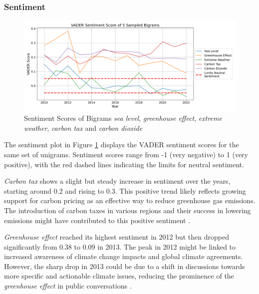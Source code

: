 \subsubsection{Sentiment}
\begin{figure}[h]
    \includegraphics[width=\textwidth]{images/topic_details/ngram/sentiment_per_topic_5Bigram.png}
    \caption{Sentiment Scores of Bigrams \emph{sea level}, \emph{greenhouse effect}, \emph{extreme weather}, \emph{carbon tax} and \emph{carbon dioxide}}
    \label{fig:sentiment_bigrams}
\end{figure}
The sentiment plot in Figure \ref{fig:sentiment_bigrams} displays the VADER sentiment scores for the same set of unigrams. Sentiment scores range from -1 (very negative) to 1 (very positive), with the red dashed lines indicating the limits for neutral sentiment.

\emph{Carbon tax} shows a slight but steady increase in sentiment over the years, starting around 0.2 and rising to 0.3. This positive trend likely reflects growing support for carbon pricing as an effective way to reduce greenhouse gas emissions. The introduction of carbon taxes in various regions and their success in lowering emissions might have contributed to this positive sentiment \cite{murray2015bc}.

\emph{Greenhouse effect} reached its highest sentiment in 2012 but then dropped significantly from 0.38 to 0.09 in 2013. The peak in 2012 might be linked to increased awareness of climate change impacts and global climate agreements. However, the sharp drop in 2013 could be due to a shift in discussions towards more specific and actionable climate issues, reducing the prominence of the \emph{greenhouse effect} in public conversations \cite{ipcc2014impacts}.


